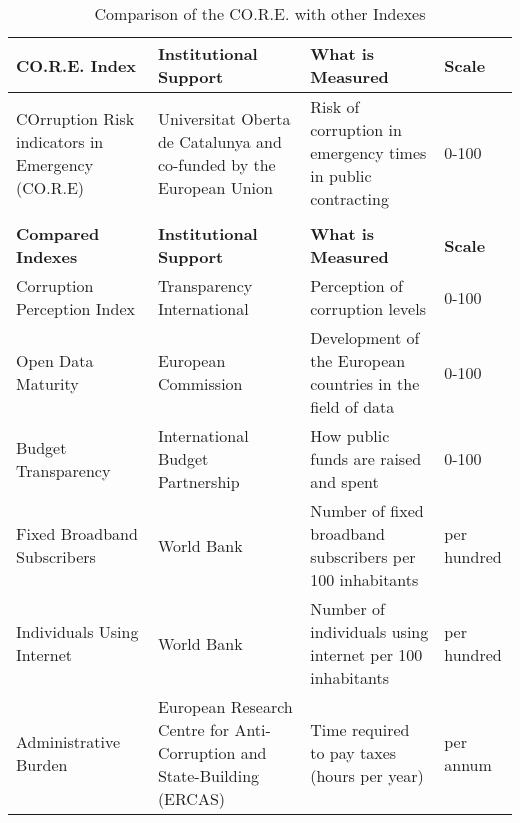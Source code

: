\documentclass[a4paper, twoside]{report}
\begin{document}
\begin{table}[htbp]
  \centering
\caption{Comparison of the CO.R.E. with other Indexes}
   \tabcolsep=0.60cm
	\renewcommand{\arraystretch}{1.8}
	\begin{adjustbox}{max width=\linewidth}
    \begin{tabular}{p{19.75em}p{17em}p{21em}p{8em}}
    \toprule
    \textbf{CO.R.E. Index} & \textbf{Institutional Support} & \textbf{What is Measured} & \textbf{Scale} \\
    \midrule
    COrruption Risk indicators in Emergency (CO.R.E) & Universitat Oberta de Catalunya and co-funded by the European Union & Risk of corruption in emergency times in public contracting & 0-100 \\
    \multicolumn{1}{r}{} & \multicolumn{1}{r}{} & \multicolumn{1}{r}{} & \multicolumn{1}{c}{} \\
    \midrule
    \textbf{Compared Indexes} & \textbf{Institutional Support} & \textbf{What is Measured} & \textbf{Scale} \\
    \midrule
    Corruption Perception Index & Transparency International & Perception of corruption levels & 0-100 \\
    Open Data Maturity & European Commission & Development of the European countries in the field of data & 0-100 \\
    Budget Transparency & International Budget Partnership & How public funds are raised and spent & 0-100 \\
    Fixed Broadband Subscribers & World Bank & Number of fixed broadband subscribers per 100 inhabitants & per hundred \\
    Individuals Using Internet & World Bank & Number of individuals using internet per 100 inhabitants & per hundred \\
    Administrative Burden & European Research Centre for Anti-Corruption and State-Building (ERCAS) & Time required to pay taxes (hours per year) & per annum \\
    \bottomrule
    \end{tabular}%
    \end{adjustbox}
  \label{tab:indexes_compared}%
\end{table}%
\end{document}
